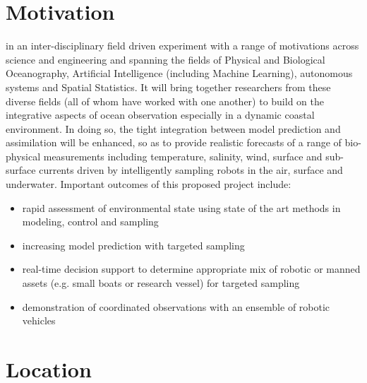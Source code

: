 \section*{Motivation}

\proj in an inter-disciplinary field driven experiment with a range of
motivations across science and engineering and spanning the fields of
Physical and Biological Oceanography, Artificial Intelligence
(including Machine Learning), autonomous systems and Spatial
Statistics. It will bring together researchers from these diverse
fields (all of whom have worked with one another) to build on the
integrative aspects of ocean observation especially in a dynamic
coastal environment.  In doing so, the tight integration between model
prediction and assimilation will be enhanced, so as to provide
realistic forecasts of a range of bio-physical measurements including
temperature, salinity, wind, surface and sub-surface currents driven
by intelligently sampling robots in the air, surface and
underwater. Important outcomes of this proposed project include:

\begin{itemize}[noitemsep,topsep=5pt,parsep=0pt,partopsep=0pt,leftmargin=0.5cm]

\item rapid assessment of environmental state using state of the art
  methods in modeling, control and sampling
\item increasing model prediction with targeted sampling
\item real-time decision support to determine appropriate mix of
  robotic or manned assets (e.g. small boats or research vessel) for
  targeted sampling
\item demonstration of coordinated observations with an ensemble of
  robotic vehicles
\end{itemize}

\section*{Location}

